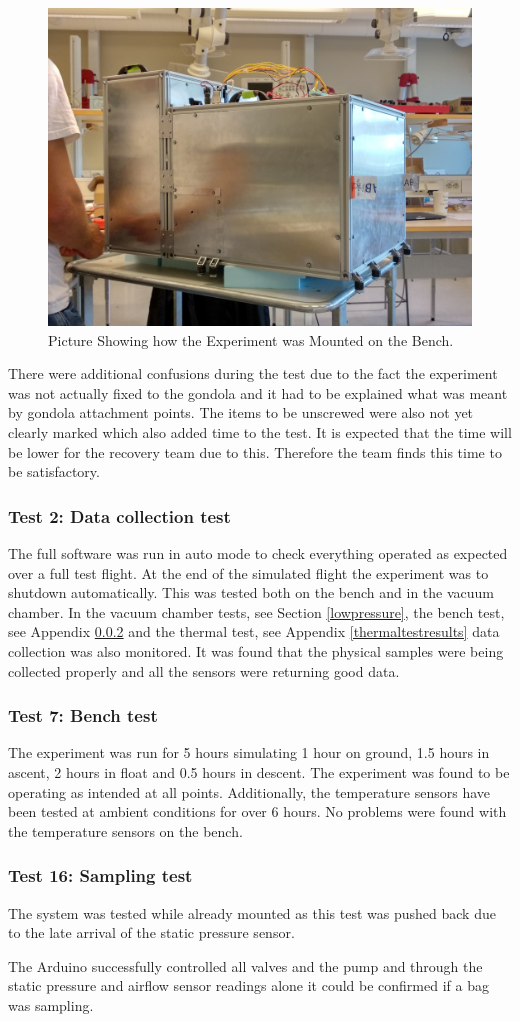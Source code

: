 \begin{figure}[H]
    \centering
    \includegraphics[width=0.4\linewidth]{appendix/img/test-results/fully-attached.jpg}
    \caption{Picture Showing how the Experiment was Mounted on the Bench.}
    \label{fig:structure-test}
\end{figure}

There were additional confusions during the test due to the fact the experiment was not actually fixed to the gondola and it had to be explained what was meant by gondola attachment points. The items to be unscrewed were also not yet clearly marked which also added time to the test. It is expected that the time will be lower for the recovery team due to this. Therefore the team finds this time to be satisfactory.


\subsubsection{Test 2: Data collection test}
The full software was run in auto mode to check everything operated as expected over a full test flight. At the end of the simulated flight the experiment was to shutdown automatically. This was tested both on the bench and in the vacuum chamber. In the vacuum chamber tests, see Section \ref{lowpressure}, the bench test, see Appendix \ref{benchtest} and the thermal test, see Appendix \ref{thermaltestresults} data collection was also monitored. It was found that the physical samples were being collected properly and all the sensors were returning good data.

\subsubsection{Test 7: Bench test}\label{benchtest}
The experiment was run for 5 hours simulating 1 hour on ground, 1.5 hours in ascent, 2 hours in float and 0.5 hours in descent. The experiment was found to be operating as intended at all points. Additionally, the temperature sensors have been tested at ambient conditions for over 6 hours. No problems were found with the temperature sensors on the bench.

\subsubsection{Test 16: Sampling test}
The system was tested while already mounted as this test was pushed back due to the late arrival of the static pressure sensor.

The Arduino successfully controlled all valves and the pump and through the static pressure and airflow sensor readings alone it could be confirmed if a bag was sampling.



